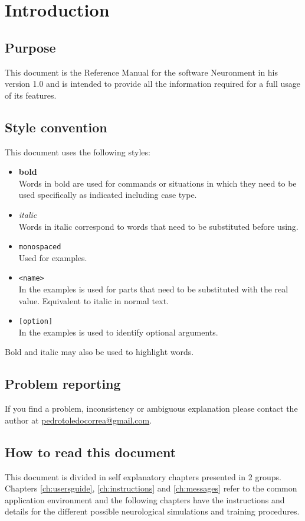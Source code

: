 \chapter{Introduction}
\label{ch:introduction}

\section{Purpose}

This document is the Reference Manual for the software Neuronment in his version 1.0 and is intended to provide
all the information required for a full usage of its features.

\section{Style convention}

This document uses the following styles:
\begin{itemize}
  \item \textbf{bold}\\  
  Words in bold are used for commands or situations in which they need to be used specifically as indicated including case type.
  \item \textit{italic}\\  
  Words in italic correspond to words that need to be substituted before using.
  \item \texttt{monospaced}\\  
  Used for examples.
  \item \texttt{<name>}\\  
  In the examples is used for parts that need to be substituted with the real value. Equivalent to italic in normal text.
  \item \texttt{[option]}\\
  In the examples is used to identify optional arguments.
\end{itemize}

Bold and italic may also be used to highlight words.

\section{Problem reporting}

If you find a problem, inconsistency or ambiguous explanation please contact the author at \href{mailto:pedrotoledocorrea@gmail.com}{pedrotoledocorrea@gmail.com}.

\section{How to read this document}

This document is divided in self explanatory chapters presented in 2 groups. Chapters \ref{ch:usersguide}, \ref{ch:instructions} and \ref{ch:messages} refer to the common application environment and the following chapters have the instructions and details for the different possible neurological simulations and training procedures.

\newpage
